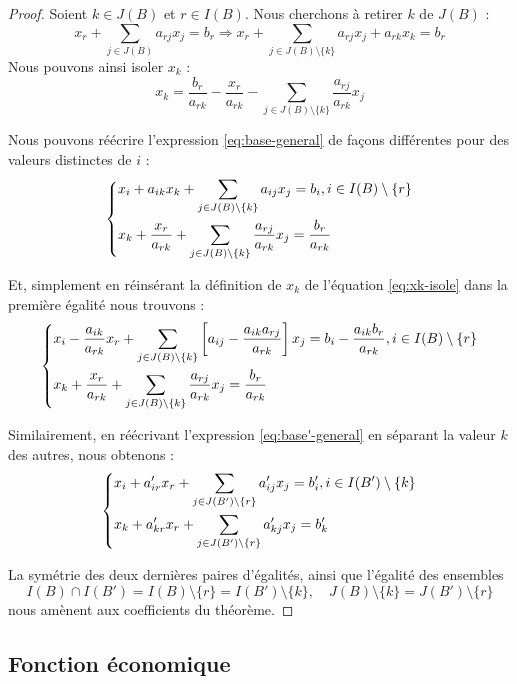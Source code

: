\documentclass[a4paper]{report}
\theoremstyle{definition}
\theoremstyle{remark}
\theoremstyle{plain}
\begin{document}
\begin{proof}
Soient $k \in J(B)$ et $r \in I(B)$. Nous cherchons à retirer $k$ de $J(B)$ :
\[ x_r + \sum_{j \in J(B)}{a_{rj}x_j} = b_r \Rightarrow x_r + \sum_{j \in J(B) \setminus \{k\}}{a_{rj}x_j} + a_{rk}x_k = b_r \]
Nous pouvons ainsi isoler $x_k$ :
\begin{equation}
\label{eq:xk-isole}
x_k = \frac{b_r}{a_{rk}} - \frac{x_r}{a_{rk}} - \sum_{j \in J(B) \setminus \{k\}}{\frac{a_{rj}}{a_{rk}} x_j}
\end{equation}

Nous pouvons réécrire l'expression \ref{eq:base-general} de façons différentes pour des valeurs distinctes de $i$ :
\[\begin{dcases}
	x_i + a_{ik}x_k + \sum_{j \in J(B) \setminus \{k\}}{a_{ij}x_j} = b_i , i \in I(B) \setminus \{r\} \\
	x_k + \frac{x_r}{a_{rk}} + \sum_{j \in J(B) \setminus \{k\}}{\frac{a_{rj}}{a_{rk}}} x_j = \frac{b_r}{a_{rk}}
\end{dcases}\]

Et, simplement en réinsérant la définition de $x_k$ de l'équation \ref{eq:xk-isole} dans la première égalité nous trouvons :
\[\begin{dcases}
	x_i - \frac{a_{ik}}{a_{rk}}x_r + \sum_{j \in J(B) \setminus \{k\}}{ \left[ a_{ij} - \frac{a_{ik}a_{rj}}{a_{rk}} \right] x_j} = b_i - \frac{a_{ik}b_r}{a_{rk}} , i \in I(B) \setminus \{r\} \\
	x_k + \frac{x_r}{a_{rk}} + \sum_{j \in J(B) \setminus \{k\}}{\frac{a_{rj}}{a_{rk}}} x_j = \frac{b_r}{a_{rk}}
\end{dcases}\]

Similairement, en réécrivant l'expression \ref{eq:base'-general} en séparant la valeur $k$ des autres, nous obtenons :
\[\begin{dcases}
	x_i + a'_{ir}x_r + \sum_{j \in J(B') \setminus \{r\}}{a'_{ij}x_j} = b'_i , i \in I(B') \setminus \{k\} \\
	x_k + a'_{kr}x_r + \sum_{j \in J(B') \setminus \{r\}}{a'_{kj} x_j} = b'_k
\end{dcases}\]

La symétrie des deux dernières paires d'égalités, ainsi que l'égalité des ensembles
\[I(B) \cap I(B') = I(B) \setminus \{r\} = I(B') \setminus \{k\} , \quad J(B) \setminus \{k\} = J(B') \setminus \{r\}\]
nous amènent aux coefficients du théorème.
\end{proof}

\subsection{Fonction économique}
\end{document}
